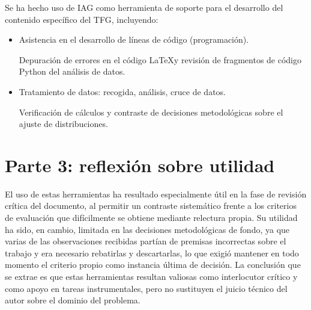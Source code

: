 Se ha hecho uso de IAG como herramienta de soporte para el desarrollo del contenido
específico del TFG, incluyendo:

\begin{itemize}[leftmargin=1.4em]
  \item Asistencia en el desarrollo de líneas de código (programación).
  
  Depuración de errores en el código \LaTeX y revisión de fragmentos de código Python del análisis de datos.

  \item Tratamiento de datos: recogida, análisis, cruce de datos.

  Verificación de cálculos y contraste de decisiones metodológicas sobre el ajuste de distribuciones.
\end{itemize}



\section*{Parte 3: reflexión sobre utilidad}


El uso de estas herramientas ha resultado especialmente útil en la fase de revisión crítica del documento,
al permitir un contraste sistemático frente a los criterios de evaluación que difícilmente se obtiene mediante
relectura propia. Su utilidad ha sido, en cambio, limitada en las decisiones metodológicas de fondo, ya que varias de las
observaciones recibidas partían de premisas incorrectas sobre el trabajo y era necesario rebatirlas y descartarlas, lo que
exigió mantener en todo momento el criterio propio como instancia última de decisión. La conclusión que se extrae es que
estas herramientas resultan valiosas como interlocutor crítico y como apoyo en tareas instrumentales, pero no sustituyen el
juicio técnico del autor sobre el dominio del problema.